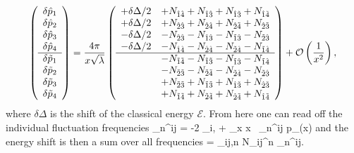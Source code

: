 \begin{equation}
\left(
\begin{array}{c}
  \delta \hat{p}_1 \\
  \delta \hat{p}_2 \\
  \delta \hat{p}_3 \\
  \delta \hat{p}_4 \\
  \hline
  \delta \tilde{p}_1 \\
  \delta \tilde{p}_2 \\
  \delta \tilde{p}_3 \\
  \delta \tilde{p}_4 \\
\end{array}
\right) = \frac{4 \pi}{x \sqrt{\lambda}}
\left(
\begin{array}{rl}
  + \delta \Delta/2 &+ N_{\hat{1}\hat{4}} + N_{\hat{1}\hat{3}} + N_{\hat{1}\tilde{3}} + N_{\hat{1}\tilde{4}} \\
  + \delta \Delta/2 &+ N_{\hat{2}\hat{3}} + N_{\hat{2}\hat{4}} + N_{\hat{2}\tilde{4}} + N_{\hat{2}\tilde{3}} \\
  - \delta \Delta/2 &- N_{\hat{2}\hat{3}} - N_{\hat{1}\hat{3}} - N_{\tilde{1}\hat{3}} - N_{\tilde{2}\hat{3}} \\
  - \delta \Delta/2 &- N_{\hat{1}\hat{4}} - N_{\hat{2}\hat{4}} - N_{\tilde{2}\hat{4}} - N_{\tilde{1}\hat{4}} \\
  \hline
   &- N_{\tilde{1}\tilde{4}} - N_{\tilde{1}\tilde{3}} - N_{\tilde{1}\hat{3}} - N_{\tilde{1}\hat{4}} \\
   &- N_{\tilde{2}\tilde{3}} - N_{\tilde{2}\tilde{4}} - N_{\tilde{2}\hat{4}} - N_{\tilde{2}\hat{3}} \\
   &+ N_{\tilde{2}\tilde{3}} + N_{\tilde{1}\tilde{3}} + N_{\hat{1}\tilde{3}} + N_{\hat{2}\tilde{3}} \\
   &+ N_{\tilde{1}\tilde{4}} + N_{\tilde{2}\tilde{4}} + N_{\hat{2}\tilde{4}} + N_{\hat{1}\tilde{4}} \\
\end{array}
\right) + \mathcal{O}\left(\frac{1}{x^2}\right),
\label{eq:asymptotics}
\end{equation}
where $\delta\Delta$ is the shift of the classical energy $\mathcal{E}$. From here one can read off the individual fluctuation frequencies
\beq
	\label{eq:quasi_energy}
	\Omega_n^{ij} = -2 \delta_{i,} + \frac{\lambda}{2\pi} \lim_{x\rightarrow \infty} x \, \delta_n^{ij} p_{}(x)
\eeq
and the energy shift is then a sum over all frequencies
\beq
	\delta \Delta = \sum_{ij,n} N_{ij}^n \Omega_n^{ij}.
\eeq

